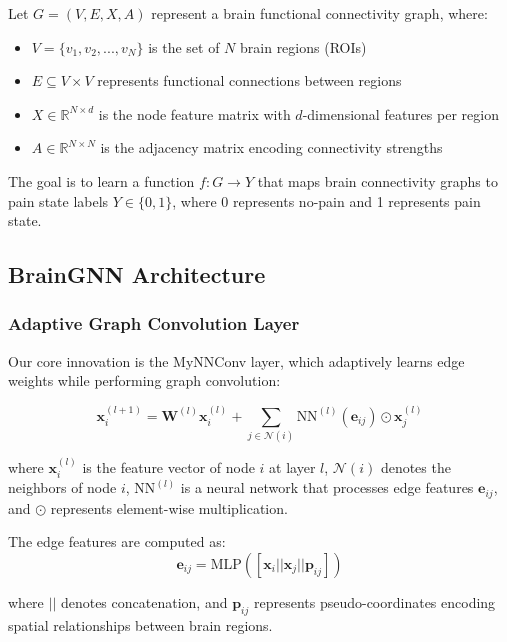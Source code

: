 \documentclass[10pt,journal,compsoc]{IEEEtran}
\begin{document}
Let $G = (V, E, X, A)$ represent a brain functional connectivity graph, where:
\begin{itemize}
\item $V = \{v_1, v_2, ..., v_N\}$ is the set of $N$ brain regions (ROIs)
\item $E \subseteq V \times V$ represents functional connections between regions
\item $X \in \mathbb{R}^{N \times d}$ is the node feature matrix with $d$-dimensional features per region
\item $A \in \mathbb{R}^{N \times N}$ is the adjacency matrix encoding connectivity strengths
\end{itemize}

The goal is to learn a function $f: G \rightarrow Y$ that maps brain connectivity graphs to pain state labels $Y \in \{0, 1\}$, where 0 represents no-pain and 1 represents pain state.

\subsection{BrainGNN Architecture}

\subsubsection{Adaptive Graph Convolution Layer}

Our core innovation is the MyNNConv layer, which adaptively learns edge weights while performing graph convolution:

\begin{equation}
\mathbf{x}_i^{(l+1)} = \mathbf{W}^{(l)} \mathbf{x}_i^{(l)} + \sum_{j \in \mathcal{N}(i)} \text{NN}^{(l)}(\mathbf{e}_{ij}) \odot \mathbf{x}_j^{(l)}
\end{equation}

where $\mathbf{x}_i^{(l)}$ is the feature vector of node $i$ at layer $l$, $\mathcal{N}(i)$ denotes the neighbors of node $i$, $\text{NN}^{(l)}$ is a neural network that processes edge features $\mathbf{e}_{ij}$, and $\odot$ represents element-wise multiplication.

The edge features are computed as:
\begin{equation}
\mathbf{e}_{ij} = \text{MLP}([\mathbf{x}_i || \mathbf{x}_j || \mathbf{p}_{ij}])
\end{equation}

where $||$ denotes concatenation, and $\mathbf{p}_{ij}$ represents pseudo-coordinates encoding spatial relationships between brain regions.
\end{document}
